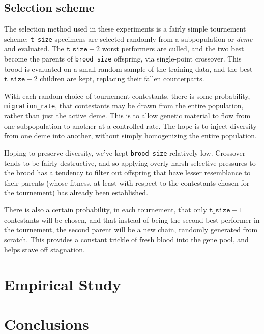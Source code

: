 \subsection{Selection scheme}

The selection method used in these experiments is a fairly simple
tournement scheme: \texttt{t\_size} specimens are selected randomly from a
subpopulation or \emph{deme} and evaluated. The
$\texttt{t\_size}-2$ worst
performers are culled, and the two best become the parents of
\texttt{brood\_size} offspring, via single-point crossover. This
brood is evaluated on a small random sample of the training data,
and the best $\texttt{t\_size} - 2$ children are kept, replacing
their fallen counterparts. 

With each random choice of tournement contestants, there is some
probability, \texttt{migration\_rate}, that contestants may be
drawn from the entire population, rather than just the active
deme. This is to allow genetic material to flow from one
subpopulation to another at a controlled rate. The hope is to
inject diversity from one deme into another, without simply
homogenizing the entire population. 

Hoping to preserve diversity, we've kept \texttt{brood\_size}
relatively low. Crossover tends to be fairly destructive, and so
applying overly harsh selective pressures to the brood has a
tendency to filter out offspring that have lesser resemblance to
their parents (whose fitness, at least with respect to the
contestants chosen for the tournement) has already been
established. 

There is also a certain probability, in each tournement, that
only $\texttt{t\_size} - 1$ contestants will be chosen, and that
instead of being the second-best performer in the tournement, the
second parent will be a new chain, randomly generated from
scratch. This provides a constant trickle of fresh blood into the
gene pool, and helps stave off stagnation.



\section{Empirical Study}




\section{Conclusions}



\begin{acks}


\end{acks}
